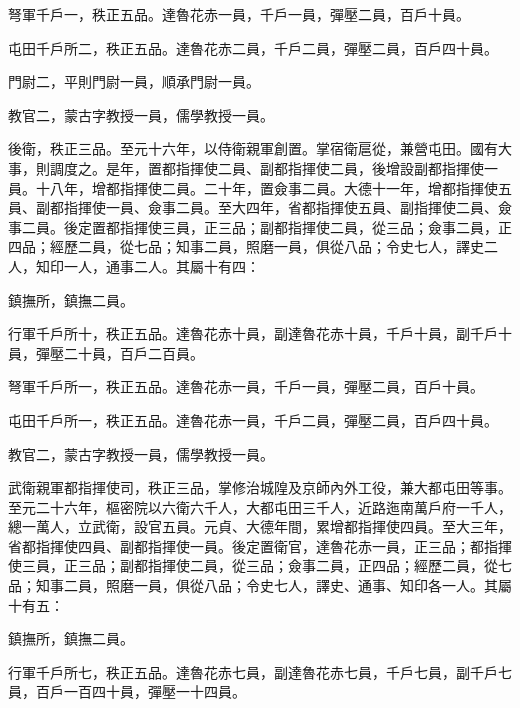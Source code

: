 \begin{pinyinscope}
 弩軍千戶一，秩正五品。達魯花赤一員，千戶一員，彈壓二員，百戶十員。



 屯田千戶所二，秩正五品。達魯花赤二員，千戶二員，彈壓二員，百戶四十員。



 門尉二，平則門尉一員，順承門尉一員。



 教官二，蒙古字教授一員，儒學教授一員。



 後衛，秩正三品。至元十六年，以侍衛親軍創置。掌宿衛扈從，兼營屯田。國有大事，則調度之。是年，置都指揮使二員、副都指揮使二員，後增設副都指揮使一員。十八年，增都指揮使二員。二十年，置僉事二員。大德十一年，增都指揮使五員、副都指揮使一員、僉事二員。至大四年，省都指揮使五員、副指揮使二員、僉事二員。後定置都指揮使三員，正三品；副都指揮使二員，從三品；僉事二員，正四品；經歷二員，從七品；知事二員，照磨一員，俱從八品；令史七人，譯史二人，知印一人，通事二人。其屬十有四：



 鎮撫所，鎮撫二員。



 行軍千戶所十，秩正五品。達魯花赤十員，副達魯花赤十員，千戶十員，副千戶十員，彈壓二十員，百戶二百員。



 弩軍千戶所一，秩正五品。達魯花赤一員，千戶一員，彈壓二員，百戶十員。



 屯田千戶所一，秩正五品。達魯花赤一員，千戶二員，彈壓二員，百戶四十員。



 教官二，蒙古字教授一員，儒學教授一員。



 武衛親軍都指揮使司，秩正三品，掌修治城隍及京師內外工役，兼大都屯田等事。至元二十六年，樞密院以六衛六千人，大都屯田三千人，近路迤南萬戶府一千人，總一萬人，立武衛，設官五員。元貞、大德年間，累增都指揮使四員。至大三年，省都指揮使四員、副都指揮使一員。後定置衛官，達魯花赤一員，正三品；都指揮使三員，正三品；副都指揮使二員，從三品；僉事二員，正四品；經歷二員，從七品；知事二員，照磨一員，俱從八品；令史七人，譯史、通事、知印各一人。其屬十有五：



 鎮撫所，鎮撫二員。



 行軍千戶所七，秩正五品。達魯花赤七員，副達魯花赤七員，千戶七員，副千戶七員，百戶一百四十員，彈壓一十四員。




\end{pinyinscope}
